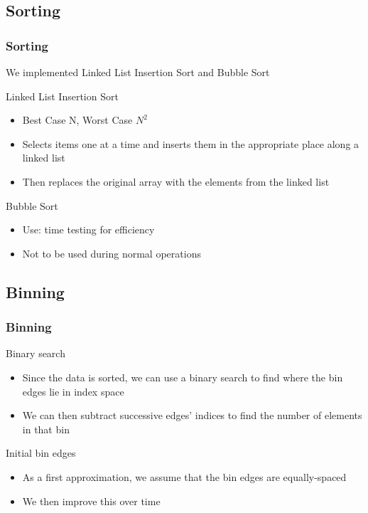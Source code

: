 \documentclass{beamer}
\begin{document}
\subsection{Sorting}

\begin{frame}    
    \frametitle{Sorting}
    
    We implemented Linked List Insertion Sort and Bubble Sort
    
    \begin{block}{Linked List Insertion Sort}
        \begin{itemize}
            \item Best Case N, Worst Case $N^2$
            \item Selects items one at a time and inserts them in the appropriate place along a linked list
            \item Then replaces the original array with the elements from the linked list
        \end{itemize}
    \end{block}
    
    \begin{block}{Bubble Sort}
        \begin{itemize}
            \item Use: time testing for efficiency
            \item Not to be used during normal operations
        \end{itemize}
    \end{block}
\end{frame}

\subsection{Binning}

\begin{frame}	
	\frametitle{Binning}
	
	\begin{block}{Binary search}
		\begin{itemize}
			\item Since the data is sorted, we can use a binary search to find where the bin edges lie in index space
			\item We can then subtract successive edges' indices to find the number of elements in that bin
		\end{itemize}
	\end{block}
	
	\begin{block}{Initial bin edges}
		\begin{itemize}
			\item As a first approximation, we assume that the bin edges are equally-spaced
			\item We then improve this over time
		\end{itemize}
	\end{block}
\end{frame}
\end{document}
